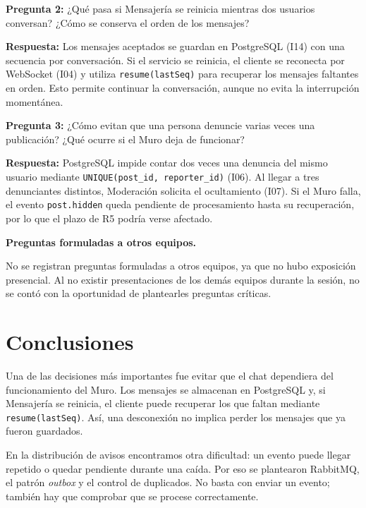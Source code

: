 \documentclass[12pt,a4paper]{article}
\begin{document}
\textbf{Pregunta 2:} ¿Qué pasa si Mensajería se reinicia mientras
dos usuarios conversan? ¿Cómo se conserva el orden de los mensajes?

\textbf{Respuesta:} Los mensajes aceptados se guardan en PostgreSQL
(I14) con una secuencia por conversación. Si el servicio se reinicia,
el cliente se reconecta por WebSocket (I04) y utiliza
\texttt{resume(lastSeq)} para recuperar los mensajes faltantes
en orden. Esto permite continuar la conversación, aunque
no evita la interrupción momentánea.

\textbf{Pregunta 3:} ¿Cómo evitan que una persona denuncie varias
veces una publicación? ¿Qué ocurre si el Muro deja de funcionar?

\textbf{Respuesta:} PostgreSQL impide contar dos veces una denuncia
del mismo usuario mediante
\texttt{UNIQUE(post\_id, reporter\_id)} (I06).
Al llegar a tres denunciantes distintos, Moderación solicita
el ocultamiento (I07). Si el Muro falla, el evento
\texttt{post.hidden} queda pendiente de procesamiento
hasta su recuperación, por lo que el plazo de R5 podría
verse afectado.


\textbf{Preguntas formuladas a otros equipos.}

No se registran preguntas formuladas a otros equipos, ya que no hubo exposición presencial. Al no existir presentaciones de los demás equipos durante la sesión, no se contó con la oportunidad de plantearles preguntas críticas.



\section{Conclusiones}

Una de las decisiones más importantes fue evitar que el chat
dependiera del funcionamiento del Muro. Los mensajes se
almacenan en PostgreSQL y, si Mensajería se reinicia,
el cliente puede recuperar los que faltan mediante
\texttt{resume(lastSeq)}. Así, una desconexión no implica
perder los mensajes que ya fueron guardados.

En la distribución de avisos encontramos otra dificultad:
un evento puede llegar repetido o quedar pendiente durante
una caída. Por eso se plantearon RabbitMQ, el patrón
\textit{outbox} y el control de duplicados. No basta con
enviar un evento; también hay que comprobar que se procese
correctamente.
\end{document}
